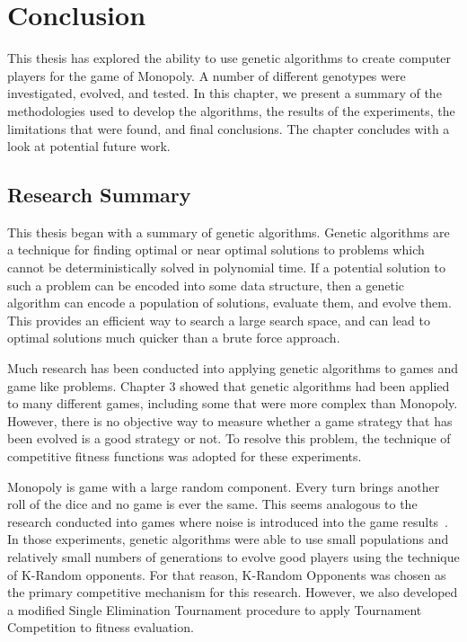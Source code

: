 \clearpage
\chapter{Conclusion}\label{chap:conclusion}

This thesis has explored the ability to use genetic algorithms to create
computer players for the game of Monopoly. A number of different genotypes were
investigated, evolved, and tested. In this chapter, we present a summary of the
methodologies used to develop the algorithms, the results of the experiments,
the limitations that were found, and final conclusions. The chapter concludes
with a look at potential future work.

\section{Research Summary}

This thesis began with a summary of genetic algorithms. Genetic algorithms are a
technique for finding optimal or near optimal solutions to problems which cannot
be deterministically solved in polynomial time. If a potential solution to such
a problem can be encoded into some data structure, then a genetic algorithm can
encode a population of solutions, evaluate them, and evolve them. This
provides an efficient way to search a large search space, and can
lead to optimal solutions much quicker than a brute force approach.

Much research has been conducted into  applying genetic algorithms to games and
game like problems. Chapter 3 showed that genetic algorithms had been applied to
many different games, including some that were more complex than Monopoly.
However, there is no objective way to measure whether a game strategy that has
been evolved is a good strategy or not. To resolve this problem, the technique
of competitive fitness functions was adopted for these experiments.

Monopoly is game with a large random component. Every turn brings another roll
of the dice and no game is ever the same. This seems analogous to the research
conducted into games where noise is introduced into the game
results~\cite{Panait02acomparative}. In those experiments, genetic algorithms
were able to use small populations and relatively small numbers of generations
to evolve good players using the technique of K-Random opponents. For that
reason, K-Random Opponents was chosen as the primary competitive mechanism for
this research. However, we also developed a modified Single Elimination
Tournament procedure to apply Tournament Competition to fitness evaluation.

